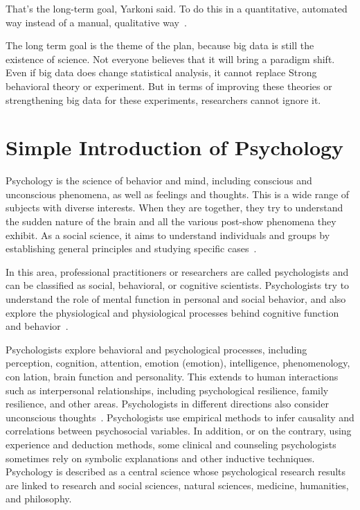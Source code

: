 That’s the long-term goal, Yarkoni said. To do this in a quantitative, 
automated way instead of a manual, qualitative way~\cite{editor00}.

The long term goal is the theme of the plan, because big data is 
still the existence of science. Not everyone believes that it will 
bring a paradigm shift. Even if big data does change statistical analysis, 
it cannot replace Strong behavioral theory or experiment. But in terms of 
improving these theories or strengthening big data for these experiments, 
researchers cannot ignore it.

\section{Simple Introduction of Psychology}

Psychology is the science of behavior and mind, including conscious 
and unconscious phenomena, as well as feelings and thoughts. This is 
a wide range of subjects with diverse interests. When they are 
together, they try to understand the sudden nature of the brain and 
all the various post-show phenomena they exhibit. As a social science,
 it aims to understand individuals and groups by establishing general
 principles and studying specific cases~\cite{editor01}.

In this area, professional practitioners or researchers are called 
psychologists and can be classified as social, behavioral, or 
cognitive scientists. Psychologists try to understand the role of 
mental function in personal and social behavior, and also explore 
the physiological and physiological processes behind cognitive 
function and behavior~\cite{editor01}.

Psychologists explore behavioral and psychological processes, 
including perception, cognition, attention, emotion (emotion), 
intelligence, phenomenology, con lation, brain function and 
personality. This extends to human interactions such as interpersonal
 relationships, including psychological resilience, family resilience,
 and other areas. Psychologists in different directions also consider
 unconscious thoughts~\cite{editor02}. Psychologists use empirical 
methods to infer causality and correlations between psychosocial variables. 
In addition, or on the contrary, using experience and deduction methods,
 some clinical and counseling psychologists sometimes rely on 
symbolic explanations and other inductive techniques. Psychology is 
described as a central science whose psychological research results 
are linked to research and social sciences, natural sciences, 
medicine, humanities, and philosophy.


